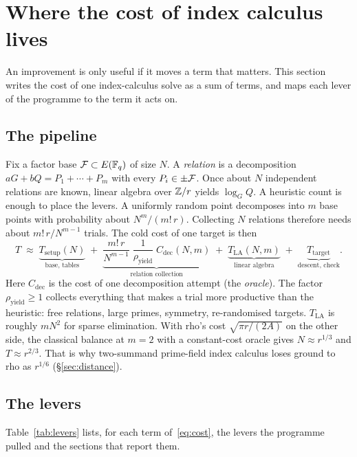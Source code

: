 \section{Where the cost of index calculus lives}\label{sec:model}

An improvement is only useful if it moves a term that matters. This section
writes the cost of one index-calculus solve as a sum of terms, and maps each
lever of the programme to the term it acts on.

\subsection{The pipeline}

Fix a factor base $\mathcal{F}\subset E(\mathbb{F}_q)$ of size $N$. A \emph{relation} is a
decomposition $aG+bQ=P_1+\cdots+P_m$ with every $P_i\in\pm\mathcal{F}$. Once about
$N$ independent relations are known, linear algebra over $\mathbb{Z}/r$ yields
$\log_G Q$. A heuristic count is enough to place the levers. A uniformly
random point decomposes into $m$ base points with probability about
$N^m/(m!\,r)$. Collecting $N$ relations therefore needs about
$m!\,r/N^{m-1}$ trials. The cold cost of one target is then
\begin{equation}\label{eq:cost}
  T \;\approx\;
  \underbrace{T_{\mathrm{setup}}(N)}_{\text{base, tables}}
  \;+\;
  \underbrace{\frac{m!\,r}{N^{m-1}}\;\frac{1}{\rho_{\mathrm{yield}}}\;
  C_{\mathrm{dec}}(N,m)}_{\text{relation collection}}
  \;+\;
  \underbrace{T_{\mathrm{LA}}(N,m)}_{\text{linear algebra}}
  \;+\;
  \underbrace{T_{\mathrm{target}}}_{\text{descent, check}}.
\end{equation}
Here $C_{\mathrm{dec}}$ is the cost of one decomposition attempt (the
\emph{oracle}). The factor $\rho_{\mathrm{yield}}\ge1$ collects everything
that makes a trial more productive than the heuristic: free relations,
large primes, symmetry, re-randomised targets. $T_{\mathrm{LA}}$ is roughly
$mN^2$ for sparse elimination. With rho's cost $\sqrt{\pi r/(2A)}$ on the
other side, the classical balance at $m=2$ with a constant-cost oracle gives
$N\approx r^{1/3}$ and $T\approx r^{2/3}$. That is why two-summand
prime-field index calculus loses ground to rho as $r^{1/6}$
(\S\ref{sec:distance}).

\subsection{The levers}

Table~\ref{tab:levers} lists, for each term of~\eqref{eq:cost}, the levers
the programme pulled and the sections that report them.

